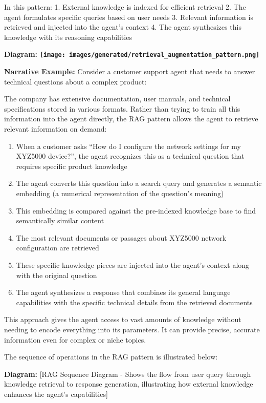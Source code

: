 \documentclass[11pt,oneside]{book}
\providecommand{\pandocbounded}[1]{\textbf{#1}}
\providecommand{\tightlist}{%
  \setlength{\itemsep}{0pt}\setlength{\parskip}{0pt}}
\begin{document}
In this pattern: 1. External knowledge is indexed for efficient
retrieval 2. The agent formulates specific queries based on user needs
3. Relevant information is retrieved and injected into the agent's
context 4. The agent synthesizes this knowledge with its reasoning
capabilities

\textbf{Diagram:}
\pandocbounded{\texttt{[image: images/generated/retrieval\_augmentation\_pattern.png]}}

\textbf{Narrative Example:} Consider a customer support agent that needs
to answer technical questions about a complex product:

The company has extensive documentation, user manuals, and technical
specifications stored in various formats. Rather than trying to train
all this information into the agent directly, the RAG pattern allows the
agent to retrieve relevant information on demand:

\begin{enumerate}
\def\labelenumi{\arabic{enumi}.}
\tightlist
\item
  When a customer asks ``How do I configure the network settings for my
  XYZ5000 device?'', the agent recognizes this as a technical question
  that requires specific product knowledge
\item
  The agent converts this question into a search query and generates a
  semantic embedding (a numerical representation of the question's
  meaning)
\item
  This embedding is compared against the pre-indexed knowledge base to
  find semantically similar content
\item
  The most relevant documents or passages about XYZ5000 network
  configuration are retrieved
\item
  These specific knowledge pieces are injected into the agent's context
  along with the original question
\item
  The agent synthesizes a response that combines its general language
  capabilities with the specific technical details from the retrieved
  documents
\end{enumerate}

This approach gives the agent access to vast amounts of knowledge
without needing to encode everything into its parameters. It can provide
precise, accurate information even for complex or niche topics.

The sequence of operations in the RAG pattern is illustrated below:

\textbf{Diagram:} {[}RAG Sequence Diagram - Shows the flow from user
query through knowledge retrieval to response generation, illustrating
how external knowledge enhances the agent's capabilities{]}
\end{document}
